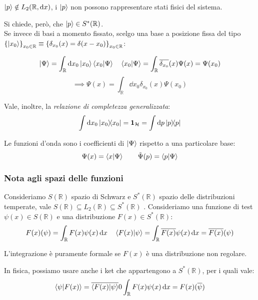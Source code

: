 \begin{attention}
    \(\ket{p} \notin L_2(\mathbb{R},\dd{x})\), i \(\ket{p}\) non possono rappresentare stati fisici del sistema.
\end{attention}

Si chiede, però,  che \(\ket{p} \in S^*(\mathbb{R})\).\\
Se invece di basi a momento fissato, scelgo una base a posizione fissa del tipo 
\(\left\{ \ket{x_0} \right\}_{x_0 \in\mathbb{R}}\equiv \left\{\delta_{x_0}(x)= \delta(x-x_0)\right\}_{x_0 \in \mathbb{R}}\):

\begin{equation*}
    \ket{\Psi}= \int_\mathbb{R}\dd{x_0} \ket{x_0}\braket{x_0}{\Psi} \quad   
    \braket{x_0}{\Psi} = \int_\mathbb{R} \overline{\delta_{x_0}}(x) \Psi(x)= \Psi(x_0)
\end{equation*}
\begin{equation}
    \implies \Psi(x)= \int_\mathbb{R} \dd{x_0} \delta_{x_0}(x)\Psi(x_0)
\end{equation}

Vale, inoltre, la \textit{relazione di completezza generalizzata}: 
\begin{equation}
    \int \dd{x_0} \dyad{x_0}{x_0}= \mathbf{1}_\mathcal{H} = \int \dd{p} \dyad{p}{p}
\end{equation}

Le funzioni d'onda sono i coefficienti di \(\ket{\Psi}\) rispetto a una particolare base:
\begin{equation}
    \Psi(x)= \braket{x}{\Psi} \qquad \tilde{\Psi}(p) = \braket{p}{\Psi}
\end{equation}


\subsubsection{Nota agli spazi delle funzioni}
Consideriamo \(S(\mathbb{R})\) spazio di Schwarz e \(S^*(\mathbb{R})\) spazio delle distribuzioni temperate,
vale \(S(\mathbb{R})\subseteq L_2(\mathbb{R})\subseteq S^*(\mathbb{R})\) .
Consideriamo una funzione di test \(\psi(x) \in S(\mathbb{R})\) e una distribuzione \(F(x) \in S^*(\mathbb{R})\):
\[
    F(x)(\psi) = \int_\mathbb{R} F(x) \psi(x) \dd{x} \quad \braket{F(x)}{\psi} = \int_\mathbb{R}\overline{F(x)} \psi(x) \dd{x} = \overline{F(x)} (\psi)
\]
\begin{attention}
    L'integrazione è puramente formale se \(F(x)\) è una distribuzione non regolare.
\end{attention}
In fisica, possiamo usare anche i ket che appartengono a \(S^*(\mathbb{R})\), per i quali vale:
\[
    \braket{\psi}{F(x)}= \overline{\braket{F(x)}{\psi}} 0 \int_\mathbb{R} F(x) \psi (x) \dd{x} = F(x) (\overline{\psi})
\]

